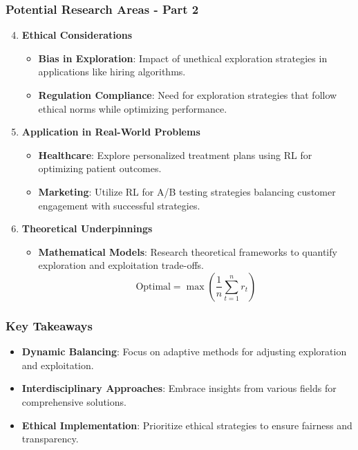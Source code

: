 \documentclass[aspectratio=169]{beamer}
\begin{document}
\begin{frame}[fragile]
    \frametitle{Potential Research Areas - Part 2}
    \begin{enumerate}
        \setcounter{enumi}{3} %
        \item \textbf{Ethical Considerations}
        \begin{itemize}
            \item \textbf{Bias in Exploration}: Impact of unethical exploration strategies in applications like hiring algorithms.
            \item \textbf{Regulation Compliance}: Need for exploration strategies that follow ethical norms while optimizing performance.
        \end{itemize}

        \item \textbf{Application in Real-World Problems}
        \begin{itemize}
            \item \textbf{Healthcare}: Explore personalized treatment plans using RL for optimizing patient outcomes.
            \item \textbf{Marketing}: Utilize RL for A/B testing strategies balancing customer engagement with successful strategies.
        \end{itemize}

        \item \textbf{Theoretical Underpinnings}
        \begin{itemize}
            \item \textbf{Mathematical Models}: Research theoretical frameworks to quantify exploration and exploitation trade-offs.
            \begin{equation}
                \text{Optimal} = \max \left( \frac{1}{n} \sum_{t=1}^{n} r_t \right)
            \end{equation}
        \end{itemize}
    \end{enumerate}
\end{frame}

\begin{frame}[fragile]
    \frametitle{Key Takeaways}
    \begin{itemize}
        \item \textbf{Dynamic Balancing}: Focus on adaptive methods for adjusting exploration and exploitation.
        \item \textbf{Interdisciplinary Approaches}: Embrace insights from various fields for comprehensive solutions.
        \item \textbf{Ethical Implementation}: Prioritize ethical strategies to ensure fairness and transparency.
    \end{itemize}
\end{frame}
\end{document}
